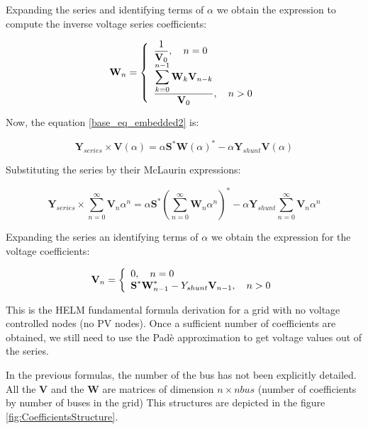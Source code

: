 \documentclass[11pt,fleqn]{book} %
\begin{document}
Expanding the series and identifying terms of $\alpha$ we obtain the expression to compute the inverse voltage series coefficients:

\begin{equation}
\textbf{W}_n =
\left\{
	\begin{array}{ll}
		\mathlarger{\frac{1}{\textbf{V}_0}}, \quad n=0\\
		\mathlarger{\frac{\mathlarger{\sum_{k=0}^{n-1}\textbf{W}_k \textbf{V}_{n-k}}}{\textbf{V}_0}}, \quad n>0
	\end{array}
\right.
\end{equation}


Now, the equation \ref{base_eq_embedded2} is:

\begin{equation}
{\textbf{Y}_{series}\times \textbf{V}( \alpha )} = \alpha\textbf{S}^* \textbf{W}( \alpha)^*  - \alpha \textbf{Y}_{shunt} \textbf{V}( \alpha )
\label{base_eq_embedded3}
\end{equation}

Substituting the series by their McLaurin expressions:

\begin{equation}
{\textbf{Y}_{series}\times \sum_{n=0}^{\infty}{\textbf{V}_n \alpha^n}} = \alpha\textbf{S}^* \left(\sum_{n=0}^{\infty}{\textbf{W}_n \alpha^n}\right)^*  - \alpha \textbf{Y}_{shunt} \sum_{n=0}^{\infty}{\textbf{V}_n \alpha^n}
\label{base_eq_embedded4}
\end{equation}

Expanding the series an identifying terms of $\alpha$ we obtain the expression for the voltage coefficients:

\begin{equation}
\textbf{V}_n =
\left\{
	\begin{array}{ll}
		\mathlarger{0}, \quad n=0\\
		\mathlarger{\textbf{S}^* \textbf{W}^*_{n-1} - Y_{shunt} \textbf{V}_{n-1} }, \quad n>0
	\end{array}
\right.
\end{equation}

This is the HELM fundamental formula derivation for a grid with no voltage controlled nodes (no PV nodes). Once a sufficient number of coefficients are obtained, we still need to use the Padè approximation to get voltage values out of the series.


In the previous formulas, the number of the bus has not been explicitly detailed. All the $\textbf{V}$ and the $\textbf{W}$ are matrices of dimension $n \times nbus$ (number of coefficients by number of buses in the grid) This structures are depicted in the figure \ref{fig:CoefficientsStructure}.
\end{document}
